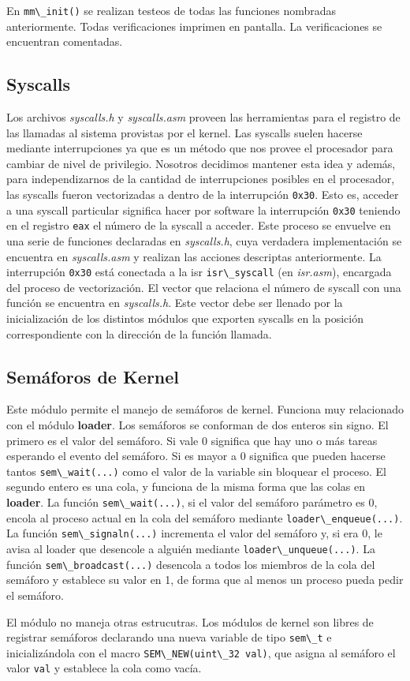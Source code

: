 \documentclass[a4paper]{article}
\newcommand{\file}[1]{\textit{#1}}
\newcommand{\func}[1]{\lstinline{#1}}
\begin{document}
En \func{mm\_init()} se realizan testeos de todas las funciones nombradas anteriormente. Todas verificaciones imprimen en pantalla. La verificaciones se encuentran comentadas. 

\subsection{Syscalls}

Los archivos \file{syscalls.h} y \file{syscalls.asm} proveen las herramientas para el registro de las llamadas al sistema provistas por el kernel. Las syscalls suelen hacerse mediante interrupciones ya que es un método que nos provee el procesador para cambiar de nivel de privilegio. Nosotros decidimos mantener esta idea y además, para independizarnos de la cantidad de interrupciones posibles en el procesador, las syscalls fueron vectorizadas a dentro de la interrupción \func{0x30}. Esto es, acceder a una syscall particular significa hacer por software la interrupción \func{0x30} teniendo en el registro \func{eax} el número de la syscall a acceder. Este proceso se envuelve en una serie de funciones declaradas en \file{syscalls.h}, cuya verdadera implementación se encuentra en \file{syscalls.asm} y realizan las acciones descriptas anteriormente. La interrupción \func{0x30} está conectada a la isr \func{isr\_syscall} (en \file{isr.asm}), encargada del proceso de vectorización. El vector que relaciona el número de syscall con una función se encuentra en \file{syscalls.h}. Este vector debe ser llenado por la inicialización de los distintos módulos que exporten syscalls en la posición correspondiente con la dirección de la función llamada. 

\subsection{Semáforos de Kernel}

Este módulo permite el manejo de semáforos de kernel. Funciona muy relacionado con el módulo \textbf{loader}. Los semáforos se conforman de dos enteros sin signo. El primero es el valor del semáforo. Si vale 0 significa que hay uno o más tareas esperando el evento del semáforo. Si es mayor a 0 significa que pueden hacerse tantos \func{sem\_wait(...)} como el valor de la variable sin bloquear el proceso. El segundo entero es una cola, y funciona de la misma forma que las colas en \textbf{loader}. La función \func{sem\_wait(...)}, si el valor del semáforo parámetro es 0, encola al proceso actual en la cola del semáforo mediante \func{loader\_enqueue(...)}. La función \func{sem\_signaln(...)} incrementa el valor del semáforo y, si era 0, le avisa al loader que desencole a alguién mediante \func{loader\_unqueue(...)}. La función \func{sem\_broadcast(...)} desencola a todos los miembros de la cola del semáforo y establece su valor en 1, de forma que al menos un proceso pueda pedir el semáforo. 

El módulo no maneja otras estrucutras. Los módulos de kernel son libres de registrar semáforos declarando una nueva variable de tipo \func{sem\_t} e inicializándola con el macro \func{SEM\_NEW(uint\_32 val)}, que asigna al semáforo el valor \func{val} y establece la cola como vacía. 
\end{document}
